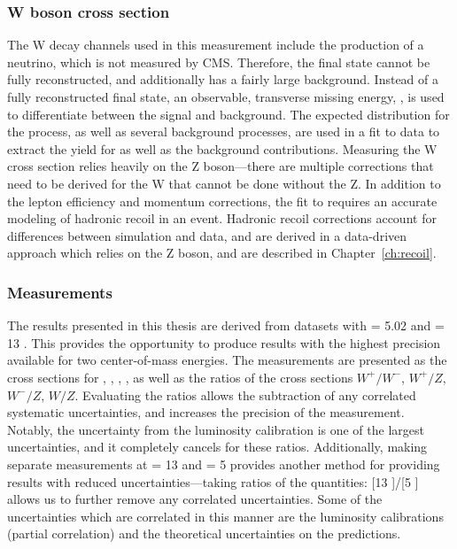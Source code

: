 \subsubsection{W boson cross section}
The W decay channels used in this measurement include the production of a neutrino, which is not measured by CMS. Therefore, the final state cannot be fully reconstructed, and additionally has a fairly large background. Instead of a fully reconstructed final state, an observable, transverse missing energy, \met, is used to differentiate between the signal and background. The expected \met distribution for the \wlnu process, as well as several background processes, are used in a fit to data to extract the yield for \nsig as well as the background contributions. 
Measuring the W cross section relies heavily on the Z boson---there are multiple corrections that need to be derived for the W that cannot be done without the Z. In addition to the lepton efficiency and momentum corrections, the fit to \met requires an accurate modeling of hadronic recoil in an event. Hadronic recoil corrections account for differences between simulation and data, and are derived in a data-driven approach which relies on the Z boson, and are described in Chapter~\ref{ch:recoil}. 


\subsubsection{Measurements}
The results presented in this thesis are derived from datasets with \s = 5.02 \TeV and \s = 13 \TeV. This provides the opportunity to produce results with the highest precision available for two center-of-mass energies. The measurements are presented as the cross sections for \Wp, \Wm, \W, \Z, as well as the ratios of the cross sections $W^+/W^-$, $W^+/Z$, $W^-/Z$, $W/Z$. Evaluating the ratios allows the subtraction of any correlated systematic uncertainties, and increases the precision of the measurement. Notably, the uncertainty from the luminosity calibration is one of the largest uncertainties, and it completely cancels for these ratios. Additionally, making separate measurements at \s = 13 \TeV and \s = 5 \TeV provides another method for providing results with reduced uncertainties---taking ratios of the quantities: [13 \TeV]/[5 \TeV] allows us to further remove any correlated uncertainties. Some of the uncertainties which are correlated in this manner are the luminosity calibrations (partial correlation) and the theoretical uncertainties on the predictions. 

